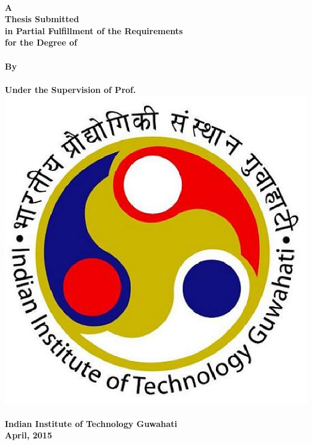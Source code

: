 \documentclass[11pt, a4paper, twoside]{Thesis} %
\begin{document}
\begin{titlepage}
\begin{center}

{\bfseries \fontsize{18}{19}\selectfont{\thesisTitle}}\\[1.5cm]


\large \textbf{A} \\ \textbf{Thesis Submitted} \\ \textbf{in Partial Fulfillment of the Requirements} \\ \textbf{for the Degree of} \\ \textbf{\expandafter\uppercase\expandafter{\degreeName}} \\ \textbf{By} \\ [1.5cm] \textbf{\expandafter\uppercase\expandafter{\authorName}}\\  \textbf{Under the Supervision of Prof. \expandafter\uppercase\expandafter{\supervisorName}} \\[1.5cm] %



\includegraphics[scale=0.4]{Images/iitglogo} \\ [3cm]



\large \textbf{\departmentName} \\ \textbf{Indian Institute of Technology Guwahati} \\  \textbf{April, 2015}\\ [0.3cm]


\end{center}



\end{titlepage}
\end{document}

